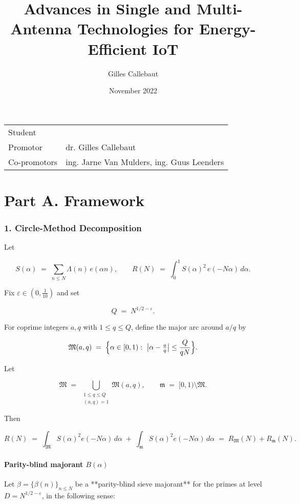 \documentclass[11pt]{article}
\title{Advances in Single and Multi-Antenna Technologies for Energy-Efficient IoT
}
\author{Gilles Callebaut}
\date{November 2022}
\makeatletter
\theoremstyle{definition}
\theoremstyle{remark}
\providecommand{\theauthor}{\@author}
\makeatother
\begin{document}
\maketitle

\noindent\begin{tabular}{@{}ll}
    Student & \theauthor\\
     Promotor &  dr. Gilles Callebaut\\
     Co-promotors & ing. Jarne Van Mulders, ing. Guus Leenders
\end{tabular}

\part*{Part A. Framework}

\section*{1. Circle-Method Decomposition}

Let

$$
S(\alpha)\;=\;\sum_{n\le N}\Lambda(n)\,e(\alpha n),\qquad
R(N)\;=\;\int_{0}^{1} S(\alpha)^2\,e(-N\alpha)\,d\alpha .
$$

Fix $\varepsilon\in (0,\tfrac1{10})$ and set

$$
Q \;=\; N^{1/2-\varepsilon}.
$$

For coprime integers $a,q$ with $1\le q\le Q$, define the major arc around $a/q$ by

$$
\mathfrak M(a,q)\;=\;\Bigl\{\alpha\in[0,1):\ \bigl|\alpha-\tfrac{a}{q}\bigr|
\le \frac{Q}{qN}\Bigr\}.
$$

Let

$$
\mathfrak M\;=\;\bigcup_{\substack{1\le q\le Q\\ (a,q)=1}}\mathfrak M(a,q),
\qquad
\mathfrak m\;=\;[0,1)\setminus\mathfrak M .
$$

Then

$$
R(N)\;=\;\int_{\mathfrak M} S(\alpha)^2 e(-N\alpha)\,d\alpha\;+\;
\int_{\mathfrak m} S(\alpha)^2 e(-N\alpha)\,d\alpha
\;=\;R_{\mathfrak M}(N)+R_{\mathfrak m}(N).
$$


\subsection*{Parity-blind majorant $B(\alpha)$}

Let $\beta=\{\beta(n)\}_{n\le N}$ be a **parity-blind sieve majorant** for the primes at level $D=N^{1/2-\varepsilon}$, in the following sense:
\end{document}
